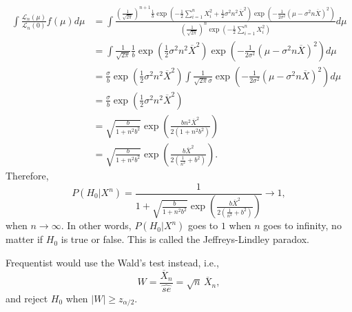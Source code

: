 \begin{equation*}
    \begin{split}
        \int \frac{\mathcal{L}_n(\mu)}{\mathcal{L}_n(0)} f(\mu) d\mu
            &= \int \frac{
                    \left(\frac{1}{\sqrt{2\pi}}\right)^{n + 1} \frac{1}{b}
                        \exp\left(-\frac{1}{2}\sum_{i = 1}^n X_i^2 + \frac{1}{2}\sigma^2 n^2 \overline{X}^2 \right)
                        \exp\left(-\frac{1}{2\sigma^2} \left(\mu - \sigma^2 n \overline{X}\right)^2\right)
                }{
                    \left(\frac{1}{\sqrt{2\pi}}\right)^n \exp\left(-\frac{1}{2}\sum_{i = 1}^n X_i^2\right)
                } d\mu \\
            &= \int \frac{1}{\sqrt{2\pi}} \frac{1}{b} \exp\left(\frac{1}{2}\sigma^2 n^2 \overline{X}^2\right)
                        \exp\left(-\frac{1}{2\sigma^2} \left(\mu - \sigma^2 n \overline{X}\right)^2\right) d\mu \\
            &= \frac{\sigma}{b} \exp\left(\frac{1}{2}\sigma^2 n^2 \overline{X}^2\right)
                        \int \frac{1}{\sqrt{2\pi}\sigma} \exp\left(-\frac{1}{2\sigma^2} \left(\mu - \sigma^2 n \overline{X}\right)^2\right) d\mu \\
            &= \frac{\sigma}{b} \exp\left(\frac{1}{2}\sigma^2 n^2 \overline{X}^2\right) \\
            &= \sqrt{\frac{b}{1 + n^2 b^2}} \exp\left(\frac{bn^2\overline{X}^2}{2(1 + n^2b^2)}\right) \\
            &= \sqrt{\frac{b}{1 + n^2 b^2}} \exp\left(\frac{b\overline{X}^2}{2(\frac{1}{n^2} + b^2)}\right).
    \end{split}
\end{equation*}
Therefore,
\begin{equation*}
    P(H_0|X^n) = \frac{1}{1 + \sqrt{\frac{b}{1 + n^2 b^2}} \exp\left(\frac{b\overline{X}^2}{2(\frac{1}{n^2} + b^2)}\right)}
        \longrightarrow 1,
\end{equation*}
when $n \to \infty$.
In other words, $P(H_0|X^n)$ goes to $1$ when $n$ goes to infinity, no matter if $H_0$ is true or false.
This is called the Jeffreys-Lindley paradox.

Frequentist would use the Wald's test instead, i.e.,
$$
    W = \frac{\overline{X}_n}{\hat{se}} = \sqrt{n}\,\overline{X}_n,
$$
and reject $H_0$ when $|W| \geq z_{\alpha/2}$.
